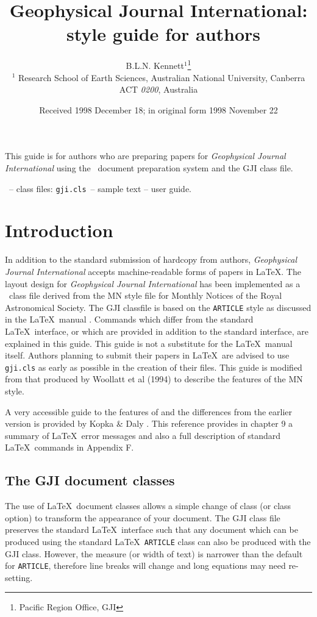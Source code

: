 \documentclass{gji}
\title[Geophys.\ J.\ Int.: \LaTeXe\ Guide for Authors]
  {Geophysical Journal International:
   \LaTeXe\ style guide for authors}
\author[B.L.N. Kennett]
  {B.L.N. Kennett$^1$\thanks{Pacific Region Office, GJI} \\
  $^1$ Research School of Earth Sciences, Australian National
    University, Canberra ACT \emph{0200}, Australia
  }
\date{Received 1998 December 18; in original form 1998 November 22}
\begin{document}
\label{firstpage}

\maketitle


\begin{summary}
 This guide is for authors who are preparing papers for
 \textit{Geophysical Journal International} using the
\LaTeXe\ document preparation system and the GJI class file.
\end{summary}

\begin{keywords}
 \LaTeXe\ -- class files: \verb"gji.cls"\ -- sample text -- user guide.
\end{keywords}

\section{Introduction}

In addition to the standard submission of hardcopy from authors,
\textit{Geophysical Journal International} accepts machine-readable forms
of  papers in \LaTeX.
The layout design for \textit{Geophysical Journal International} has been
implemented as a \LaTeXe\ class file derived from the MN style file for
Monthly Notices of the Royal Astronomical Society. The GJI classfile is
based on the \verb"ARTICLE" style as discussed in the \LaTeX\ manual
\cite {la}. Commands which differ from the standard \LaTeX\ interface, or
which are provided in addition to the standard interface, are explained
in this guide. This guide is not a substitute for the \LaTeX\ manual
itself. Authors planning to submit their papers in \LaTeX\ are advised to
use \verb"gji.cls" as  early as possible in the creation of their
files.  This guide is modified from that produced by Woollatt et al (1994)
to describe the features of the MN style.

A very accessible guide to the features of \LaTeXe and the differences
from the earlier version is provided by Kopka \& Daly .  This
reference provides in chapter 9 a summary of \LaTeX\ error messages and also
a full description of standard \LaTeX\ commands in Appendix F.


\subsection{The GJI document classes}

The use of \LaTeX\ document classes allows a simple change of class
(or class option) to transform the appearance of your document. The
GJI class file preserves the standard \LaTeX\ interface such that any
document which can be produced using the standard \LaTeX\ \verb"ARTICLE"
class can also be produced with the GJI class. However, the measure (or
width of text) is narrower than the default for \verb"ARTICLE", therefore
line breaks will change and long equations may need re-setting.
\end{document}
